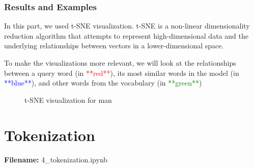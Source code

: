 \documentclass[12pt, a4paper]{article}
\begin{document}
\section*{Results and Examples}
In this part, we used t-SNE visualization. t-SNE is a non-linear dimensionality reduction algorithm that attempts to represent high-dimensional data and the underlying relationships between vectors in a lower-dimensional space.

To make the visualizations more relevant, we will look at the relationships between a query word (in \textcolor{red}{**red**}), its most similar words in the model (in \textcolor{blue}{**blue**}), and other words from the vocabulary (in \textcolor{green}{**green**})

\begin{figure}[H]
	\caption{t-SNE visualization for man}
	\label{word2vec_depression_man}
\end{figure}

\newpage
\part{Tokenization}
\large{\textbf{Filename:} 4\_tokenization.ipynb}
\end{document}
